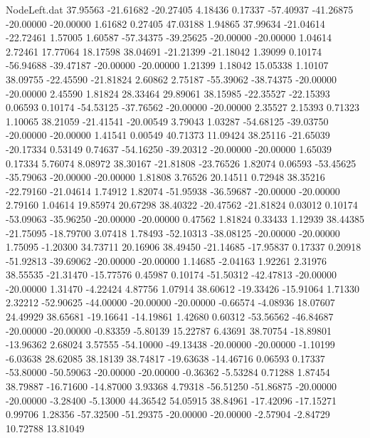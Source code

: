 \begin{filecontents}{NodeLeft.dat}
  37.95563  -21.61682  -20.27405     4.18436    0.17337  -57.40937  -41.26875  -20.00000  -20.00000    1.61682    0.27405   47.03188    1.94865
  37.99634  -21.04614  -22.72461     1.57005    1.60587  -57.34375  -39.25625  -20.00000  -20.00000    1.04614    2.72461   17.77064   18.17598
  38.04691  -21.21399  -21.18042     1.39099    0.10174  -56.94688  -39.47187  -20.00000  -20.00000    1.21399    1.18042   15.05338    1.10107
  38.09755  -22.45590  -21.81824     2.60862    2.75187  -55.39062  -38.74375  -20.00000  -20.00000    2.45590    1.81824   28.33464   29.89061
  38.15985  -22.35527  -22.15393     0.06593    0.10174  -54.53125  -37.76562  -20.00000  -20.00000    2.35527    2.15393    0.71323    1.10065
  38.21059  -21.41541  -20.00549     3.79043    1.03287  -54.68125  -39.03750  -20.00000  -20.00000    1.41541    0.00549   40.71373   11.09424
  38.25116  -21.65039  -20.17334     0.53149    0.74637  -54.16250  -39.20312  -20.00000  -20.00000    1.65039    0.17334    5.76074    8.08972
  38.30167  -21.81808  -23.76526     1.82074    0.06593  -53.45625  -35.79063  -20.00000  -20.00000    1.81808    3.76526   20.14511    0.72948
  38.35216  -22.79160  -21.04614     1.74912    1.82074  -51.95938  -36.59687  -20.00000  -20.00000    2.79160    1.04614   19.85974   20.67298
  38.40322  -20.47562  -21.81824     0.03012    0.10174  -53.09063  -35.96250  -20.00000  -20.00000    0.47562    1.81824    0.33433    1.12939
  38.44385  -21.75095  -18.79700     3.07418    1.78493  -52.10313  -38.08125  -20.00000  -20.00000    1.75095   -1.20300   34.73711   20.16906
  38.49450  -21.14685  -17.95837     0.17337    0.20918  -51.92813  -39.69062  -20.00000  -20.00000    1.14685   -2.04163    1.92261    2.31976
  38.55535  -21.31470  -15.77576     0.45987    0.10174  -51.50312  -42.47813  -20.00000  -20.00000    1.31470   -4.22424    4.87756    1.07914
  38.60612  -19.33426  -15.91064     1.71330    2.32212  -52.90625  -44.00000  -20.00000  -20.00000   -0.66574   -4.08936   18.07607   24.49929
  38.65681  -19.16641  -14.19861     1.42680    0.60312  -53.56562  -46.84687  -20.00000  -20.00000   -0.83359   -5.80139   15.22787    6.43691
  38.70754  -18.89801  -13.96362     2.68024    3.57555  -54.10000  -49.13438  -20.00000  -20.00000   -1.10199   -6.03638   28.62085   38.18139
  38.74817  -19.63638  -14.46716     0.06593    0.17337  -53.80000  -50.59063  -20.00000  -20.00000   -0.36362   -5.53284    0.71288    1.87454
  38.79887  -16.71600  -14.87000     3.93368    4.79318  -56.51250  -51.86875  -20.00000  -20.00000   -3.28400   -5.13000   44.36542   54.05915
  38.84961  -17.42096  -17.15271     0.99706    1.28356  -57.32500  -51.29375  -20.00000  -20.00000   -2.57904   -2.84729   10.72788   13.81049

\end{filecontents}
